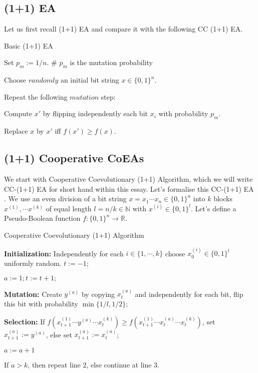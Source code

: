 \documentclass[a4paper,11pt]{report}
\theoremstyle{plain} %
\theoremstyle{definition} %
\theoremstyle{remark} %
\begin{document}
\subsection{(1+1) EA}
Let us first recall (1+1) EA and compare it with the following CC (1+1) EA.

\begin{algorithm}
\caption{Basic (1+1) EA}

       Set $p_{m}:=1/n$. \quad \# $p_{m}$ is the mutation probability
      
       Choose $randomly$ an initial bit string $x \in \{0,1\}^n$.
      
      Repeat the following $mutation$ step:
        
     \quad \quad   Compute $x'$ by flipping independently each bit $x_{i}$ with probability $p_{m}$.
         
     \quad \quad   Replace $x$ by $x'$ iff $f(x')\geq f(x)$.
\end{algorithm}

\subsection{(1+1) Cooperative CoEAs}

\par We start with Cooperative Coevolutionary (1+1) Algorithm, which we will write CC-(1+1) EA for short hand within this essay. Let's formalise this CC-(1+1) EA \citep{jansen_cooperative_2004}. We use an even division of a bit string $x=x_{1}\cdots x_{n} \in \{0,1\}^n$ into $k$ blocks $x^{(1)}, \cdots x^{(k)}$ of equal length $l=n/k \in \mathbb{N}$ with $x^{(i)} \in \{0,1\}^l$.
Let's define a Pseudo-Boolean function $f:\{0,1\}^n \rightarrow \mathbb{R}$.

\begin{algorithm}
\caption{Cooperative Coevolutionary (1+1) Algorithm \citep{jansen_cooperative_2004}}
   
    \textbf{Initialization:}  Independently for each $i \in \{1, \cdots ,k \}$ choose $x_{0}^{(i)} \in \{0,1\}^l$ uniformly random. $t:= -1$;    
    
    $a:=1; t:= t+1;$
    
    \textbf{Mutation:} Create $y^{(a)}$ by copying $x_{t}^{(a)}$ and independently for each bit, flip this bit with probability $\min\{1/l, 1/2\}$;
    
    \textbf{Selection:}  If $f(x_{t+1}^{(1)} \cdots y^{(a)} \cdots x_{t}^{(k)}) \geq f(x_{t+1}^{(1)} \cdots x_{t}^{(a)} \cdots x_{t}^{(k)})$, set $x_{t+1}^{(a)} := y^{(a)}$, else set $x_{t+1}^{(a)} := x_{t}^{(a)}$;
    
    $a:=a+1$
    
    If $a>k$, then repeat line $2$, else continue at line $3$.
    
\end{algorithm}
\end{document}
